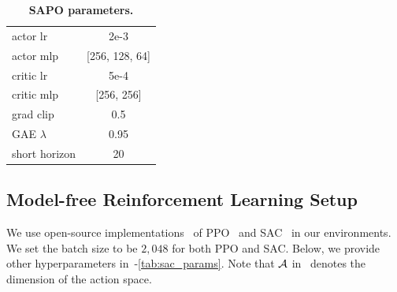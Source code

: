 \begin{table}[h]
\begin{minipage}[t]{0.23\textwidth}
{{\begin{tabular}{l|c}
            \hline
            actor lr & 2e-3 \\
            actor mlp & [256, 128, 64] \\
            critic lr & 5e-4 \\
            critic mlp & [256, 256] \\
            grad clip & 0.5 \\
            GAE $\lambda$ & 0.95\\
            short horizon & 20 \\
            \hline
        \end{tabular}
        }}
        \caption{\bf SHAC parameters.}
        \label{tab:shac_params}
    \end{minipage}
    \hfill %
    \begin{minipage}[t]{0.23\textwidth}
        \centering
        \caption{\bf SAPO parameters.}
        \label{tab:sapo_params}
    \end{minipage}
\end{table}

\subsection{Model-free Reinforcement Learning Setup}

We use open-source implementations~\citep {mushroomrl} of PPO~\citep{schulman2017proximal} and SAC~\citep{haarnoja2018soft} in our environments.  We set the batch size to be $2,048$ for both PPO and SAC.
Below, we provide other  hyperparameters in~-\ref{tab:sac_params}. Note that ${\mathcal{A}}$ in~ denotes the dimension of the action space.

